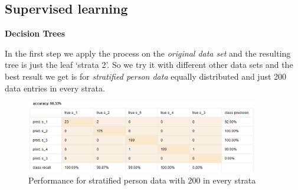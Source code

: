 \setlength{\parindent}{0em}

\subsection{Supervised learning}

\textbf{Decision Trees} \label{subsec: decisiontree}
%
%
%

In the first step we apply the process on the \textit{original data set} and the resulting tree is just the leaf `strata 2'. So we try it with different other data sets and the best result we get is for \textit{stratified person data} equally distributed and just 200 data entries in every strata.

\begin{figure}[H]
\centering
\includegraphics[width = 0.9\textwidth]{Dec200eqPrec.PNG}
\caption{Performance for stratified person data with 200 in every strata}
\label{fig:decvec200}
\end{figure}

